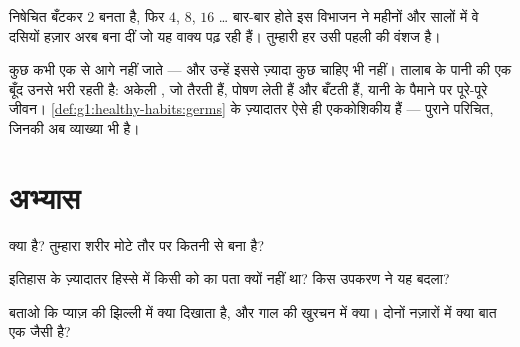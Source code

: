 \begin{example}[एक से खरबों तक]\label{ex:g5:first-look-at-cells:one}
निषेचित  बँटकर $2$  बनता है, फिर $4$, $8$,
$16$ \dots{} बार-बार होते इस विभाजन ने महीनों और सालों में वे दसियों
हज़ार अरब  बना दीं जो यह वाक्य पढ़ रही हैं। तुम्हारी हर 
उसी पहली  की वंशज है।
\end{example}

\begin{remark}[एक ही कोशिका में पूरा जीवन]\label{rem:g5:first-look-at-cells:onecelled}
कुछ  कभी एक  से आगे नहीं जाते --- और उन्हें इससे ज़्यादा कुछ
चाहिए भी नहीं। तालाब के पानी की एक बूँद उनसे भरी रहती है: अकेली
, जो तैरती हैं, पोषण लेती हैं और बँटती हैं, यानी 
के पैमाने पर पूरे-पूरे जीवन। \cref{def:g1:healthy-habits:germs} के
 ज़्यादातर ऐसे ही एककोशिकीय  हैं --- पुराने परिचित, जिनकी
अब व्याख्या भी है।
\end{remark}

\section{अभ्यास}

\begin{exercise}[$\star$]\label{exo:g5:first-look-at-cells:1}
 क्या है? तुम्हारा शरीर मोटे तौर पर कितनी  से बना है?
\end{exercise}

\begin{exercise}[$\star$]\label{exo:g5:first-look-at-cells:2}
इतिहास के ज़्यादातर हिस्से में किसी को  का पता क्यों नहीं था?
किस उपकरण ने यह बदला?
\end{exercise}

\begin{exercise}[$\star$]\label{exo:g5:first-look-at-cells:3}
बताओ कि  प्याज़ की झिल्ली में क्या दिखाता है, और गाल की
खुरचन में क्या। दोनों नज़ारों में क्या बात एक जैसी है?
\end{exercise}

